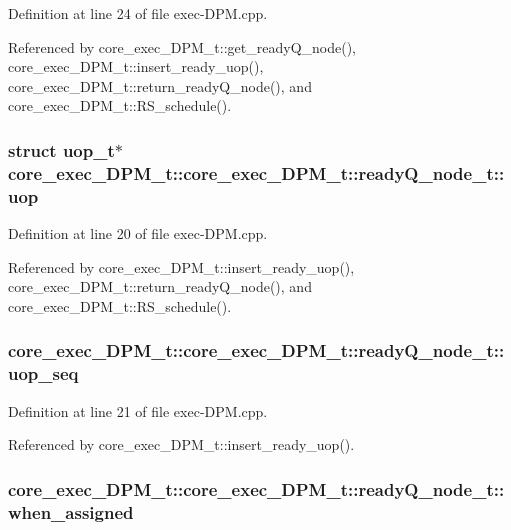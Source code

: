 Definition at line 24 of file exec-DPM.cpp.

Referenced by core\_\-exec\_\-DPM\_\-t::get\_\-readyQ\_\-node(), core\_\-exec\_\-DPM\_\-t::insert\_\-ready\_\-uop(), core\_\-exec\_\-DPM\_\-t::return\_\-readyQ\_\-node(), and core\_\-exec\_\-DPM\_\-t::RS\_\-schedule().
\subsubsection[{uop}]{\setlength{\rightskip}{0pt plus 5cm}struct {\bf uop\_\-t}$\ast$ core\_\-exec\_\-DPM\_\-t::core\_\-exec\_\-DPM\_\-t::readyQ\_\-node\_\-t::uop\hspace{0.3cm}{\tt  [read]}}\label{structcore__exec__DPM__t_1_1readyQ__node__t_b3f3a53da6ddc6d01c10a7c4ee968f2c}




Definition at line 20 of file exec-DPM.cpp.

Referenced by core\_\-exec\_\-DPM\_\-t::insert\_\-ready\_\-uop(), core\_\-exec\_\-DPM\_\-t::return\_\-readyQ\_\-node(), and core\_\-exec\_\-DPM\_\-t::RS\_\-schedule().
\subsubsection[{uop\_\-seq}]{ core\_\-exec\_\-DPM\_\-t::core\_\-exec\_\-DPM\_\-t::readyQ\_\-node\_\-t::uop\_\-seq}\label{structcore__exec__DPM__t_1_1readyQ__node__t_211d0b02c5ae04ec2034cf4be925469e}




Definition at line 21 of file exec-DPM.cpp.

Referenced by core\_\-exec\_\-DPM\_\-t::insert\_\-ready\_\-uop().
\subsubsection[{when\_\-assigned}]{ core\_\-exec\_\-DPM\_\-t::core\_\-exec\_\-DPM\_\-t::readyQ\_\-node\_\-t::when\_\-assigned}\label{structcore__exec__DPM__t_1_1readyQ__node__t_256395ddefdb2a4678c27bc02e6c6303}




